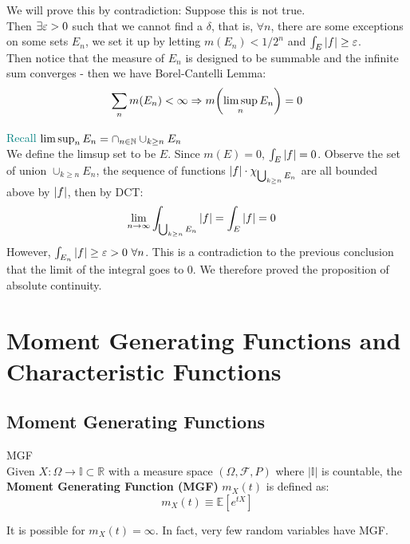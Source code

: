 \begin{prf}
We will prove this by contradiction: Suppose this is not true. \\

Then $\exists {\varepsilon}>0$ such that we cannot find a $\delta$, that is, $\forall n$, there are some exceptions on some sets $E_n$, we set it up by letting $m(E_n) <1/2^n$ and $\int_E \abs{f}\geq {\varepsilon}$. \\

Then notice that the measure of $E_n$ is designed to be summable and the infinite sum converges - then we have Borel-Cantelli Lemma: 
$$\sum_n m(E_n) < \infty \Rightarrow m\qty(\limsup_n E_n) = 0$$

\textcolor{teal}{Recall $\limsup_n E_n = \cap_{n\in\mathbb{N}}\cup_{k\geq n} E_n$}\\

We define the limsup set to be $E$. Since $m(E) = 0$, $\int_E \abs{f} = 0$. Observe the set of union $\cup_{k\geq n}E_n$, the sequence of functions $\abs{f}\cdot\chi_{\bigcup_{k\geq n} E_n}$ are all bounded above by $\abs{f}$, then by DCT: 
\begin{align*}
	\lim_{n\to\infty}\int_{\bigcup_{k\geq n} E_n} \abs{f} &= \int_E\abs{f} = 0
\end{align*}
However, $\int_{E_n} \abs{f}\geq {\varepsilon} > 0 \ \forall n$. This is a contradiction to the previous conclusion that the limit of the integral goes to 0. We therefore proved the proposition of absolute continuity.



\newpage
\section{Moment Generating Functions and Characteristic Functions}

\subsection{Moment Generating Functions}

\begin{df}{MGF}\\
Given $X: \Omega \to \mathbb{I} \subset \mathbb{R}$ with a measure space $(\Omega, \mathscr{F}, P)$ where $|\mathbb{I}|$ is countable, the \textbf{Moment Generating Function (MGF)} $m_X(t)$ is defined as:
$$m_X(t) \equiv \mathbb{E}[e^{tX}]$$
\end{df}

\begin{rmk}{}
It is possible for $m_X(t) = \infty$. In fact, very few random variables have MGF. 
\end{rmk}


\end{prf}
